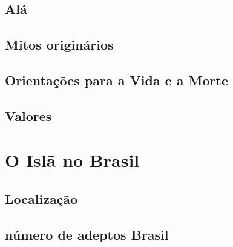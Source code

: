 \documentclass[12pt]{article}
\begin{document}
\subsection{Alá}
\subsection{Mitos originários}
\subsection{Orientações para a Vida e a Morte}
\subsection{Valores}
\section{O Islã no Brasil}
\subsection{Localização}
\subsection{número de adeptos Brasil}
\end{document}
